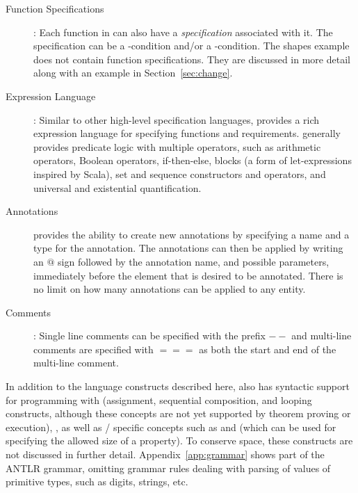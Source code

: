 \begin{description}
\item [Function Specifications]: Each function in \Klang{} can also
  have a \emph{specification} associated with it. The specification
  can be a -condition and/or a
  -condition. The shapes example does not contain function
  specifications. They are discussed in more detail along with
  an example in Section~\ref{sec:change}.
  
\item [Expression Language]: Similar to other high-level 
  specification languages, \Klang{} provides a rich
  expression language for specifying functions and
  requirements. \Klang{} generally provides predicate logic
  with  multiple operators, such as
  arithmetic  operators,
  Boolean operators, 
  if-then-else, 
  blocks (a form of let-expressions inspired by Scala), 
  set and sequence constructors and operators,
  and universal and existential quantification.

\item [Annotations] \Klang{} provides the ability to create new
  annotations by specifying a name and a type for the annotation. The
  annotations can then be applied by writing an $@$ sign followed by
  the annotation name, and possible parameters, immediately before the 
  element that is desired to be annotated. There is no limit on how many 
  annotations can be applied to any entity. 

\item [Comments]: Single line comments can be specified with the
  prefix $--$ and multi-line comments are specified with $===$ as both
  the start and end of the multi-line comment.

\end{description}

In addition to the language constructs described here, \Klang{} also
has syntactic support for programming with  (assignment,
sequential composition, and looping constructs, although these concepts are not yet supported by theorem proving or execution), , as well as \sysml{}/\uml{} specific concepts such as
 and  (which can be used for
specifying the allowed size of a property).  To conserve space, these
constructs are not discussed in further detail.
Appendix~\ref{app:grammar} shows part of the \Klang{} ANTLR grammar,
omitting grammar rules dealing with parsing of values of primitive
types, such as digits, strings, etc.

